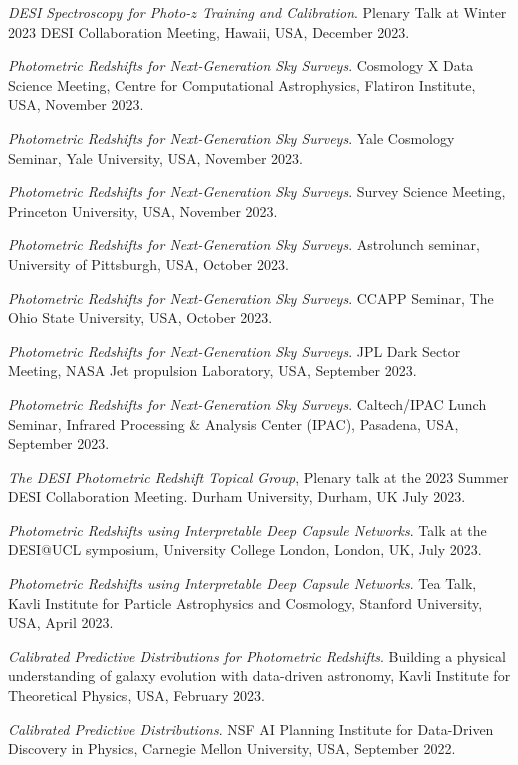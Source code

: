 
 \begin{etaremune}[leftmargin=40pt,labelsep=10pt]
     \item \textit{DESI Spectroscopy for Photo-$z$ Training and Calibration}. Plenary Talk at Winter 2023 DESI Collaboration Meeting, Hawaii, USA, December 2023.
    \item \textit{Photometric Redshifts for Next-Generation Sky Surveys}. Cosmology X Data Science Meeting, Centre for Computational Astrophysics, Flatiron Institute, USA, November 2023.
    \item \textit{Photometric Redshifts for Next-Generation Sky Surveys}. Yale Cosmology Seminar, Yale University, USA, November 2023.
    \item \textit{Photometric Redshifts for Next-Generation Sky Surveys}. Survey Science Meeting, Princeton University, USA, November 2023.
    \item \textit{Photometric Redshifts for Next-Generation Sky Surveys}. Astrolunch seminar, University of Pittsburgh, USA, October 2023.
    \item \textit{Photometric Redshifts for Next-Generation Sky Surveys}. CCAPP Seminar, The Ohio State University, USA, October 2023.
    \item \textit{Photometric Redshifts for Next-Generation Sky Surveys}. JPL Dark Sector Meeting, NASA Jet propulsion Laboratory, USA, September 2023.
    \item \textit{Photometric Redshifts for Next-Generation Sky Surveys}. Caltech/IPAC Lunch Seminar, Infrared Processing \& Analysis Center (IPAC), Pasadena, USA, September 2023.
    \item \textit{The DESI Photometric Redshift Topical Group}, Plenary talk at the 2023 Summer DESI Collaboration Meeting. Durham University, Durham, UK July 2023.
    \item \textit{Photometric Redshifts using Interpretable Deep Capsule Networks}. Talk at the DESI@UCL symposium, University College London, London, UK, July 2023.
    \item \textit{Photometric Redshifts using Interpretable Deep Capsule Networks}. Tea Talk, Kavli Institute for Particle Astrophysics and Cosmology, Stanford University, USA, April 2023.
    \item \textit{Calibrated Predictive Distributions for Photometric Redshifts}. Building a physical understanding of galaxy evolution with data-driven astronomy, Kavli Institute for Theoretical Physics, USA, February 2023.
    \item \textit{Calibrated Predictive Distributions}. NSF AI Planning Institute for Data-Driven Discovery in Physics, Carnegie Mellon University, USA, September 2022.
 

\end{etaremune}
